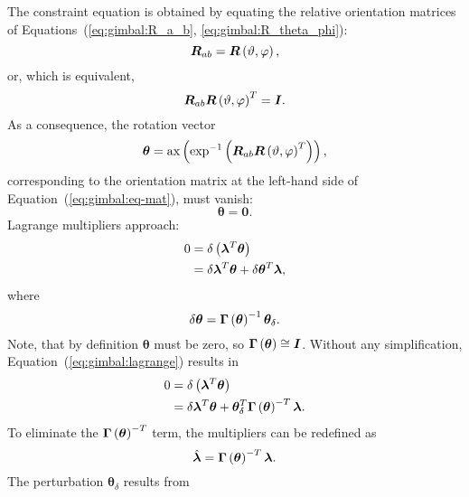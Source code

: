 \documentclass[10pt,dvips,fleqn,subeqn]{report}
\newcommand{\T}[1]{\bm{#1}}
\begin{document}
\noindent
The constraint equation is obtained by equating the relative orientation
matrices of Equations~(\ref{eq:gimbal:R_a_b}, \ref{eq:gimbal:R_theta_phi}):
\begin{equation}
	\T{R}_{ab} = \T{R}\plbr{\vartheta, \varphi} ,
\end{equation}
or, which is equivalent,
\begin{equation}
	\T{R}_{ab} \T{R}\plbr{\vartheta, \varphi}^T = \T{I} .
	\label{eq:gimbal:eq-mat}
\end{equation}
As a consequence, the rotation vector
\begin{equation}
	\T{\theta} = \llk{ax}\plbr{\llk{exp}^{-1}\plbr{
		\T{R}_{ab} \T{R}\plbr{\vartheta, \varphi}^T
	}} ,
\end{equation}
corresponding to the orientation matrix at the left-hand side
of Equation~(\ref{eq:gimbal:eq-mat}),
must vanish:
\begin{equation}
	\T{\theta} = \T{0} .
	\label{eq:GIMBAL-CONSTRAINT}
\end{equation}
Lagrange multipliers approach:
\begin{align}
	0 &= \delta\plbr{\T{\lambda}^T \T{\theta}} \nonumber \\
	&= \delta\T{\lambda}^T \T{\theta} + \delta\T{\theta}^T \T{\lambda} ,
	\label{eq:gimbal:lagrange}
\end{align}
where
\begin{equation}
	\delta\T{\theta}
	= \T{\Gamma}\plbr{\T{\theta}}^{-1} \T{\theta}_{\delta} .
\end{equation}
Note, that by definition $\T{\theta}$ must be zero,
so $\T{\Gamma}\plbr{\T{\theta}}\cong\T{I}$.
Without any simplification, Equation~(\ref{eq:gimbal:lagrange}) results in
\begin{subequations}
\begin{align}
	0 &= \delta\plbr{\T{\lambda}^T \T{\theta}} \\
	&= \delta\T{\lambda}^T \T{\theta}
	+ \T{\theta}_{\delta}^T \T{\Gamma}\plbr{\T{\theta}}^{-T}\T{\lambda} .
\end{align}
\end{subequations}
To eliminate the $\T{\Gamma}\plbr{\T{\theta}}^{-T}$ term,
the multipliers can be redefined as 
\begin{equation}
	\hat{\T{\lambda}} = \T{\Gamma}\plbr{\T{\theta}}^{-T} \T{\lambda} .
\end{equation}
The perturbation $\T{\theta}_{\delta}$ results from
\end{document}
